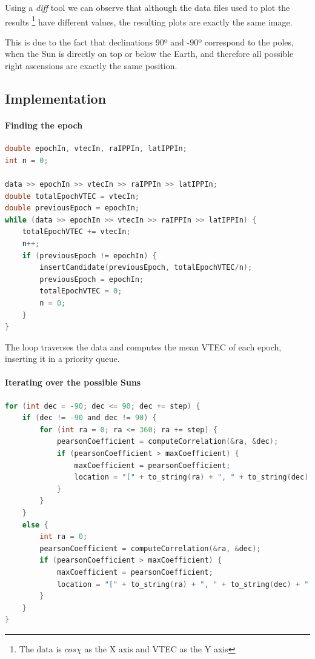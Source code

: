 Using a \textit{diff} tool we can observe that although the data files used to plot the results \footnote{The data is $cos\chi$ as the X axis and VTEC as the Y axis} have different values, the resulting plots are exactly the same image.

This is due to the fact that declinations 90º and -90º correspond to the poles, when the Sun is directly on top or below the Earth, and therefore all possible right ascensions are exactly the same position.

\subsection{Implementation}

\paragraph{Finding the epoch}

\begin{minipage}{\linewidth}
\begin{lstlisting}[language=c, caption=Finding a VTEC spike]
double epochIn, vtecIn, raIPPIn, latIPPIn;
int n = 0;

data >> epochIn >> vtecIn >> raIPPIn >> latIPPIn;
double totalEpochVTEC = vtecIn;
double previousEpoch = epochIn;
while (data >> epochIn >> vtecIn >> raIPPIn >> latIPPIn) {
	totalEpochVTEC += vtecIn;
	n++;
	if (previousEpoch != epochIn) {
		insertCandidate(previousEpoch, totalEpochVTEC/n);
		previousEpoch = epochIn;
		totalEpochVTEC = 0;
		n = 0;
	}
}
\end{lstlisting}
\end{minipage}

The loop traverses the data and computes the mean VTEC of each epoch, inserting it in a priority queue.

\paragraph{Iterating over the possible Suns}
\begin{minipage}{\linewidth}
\begin{lstlisting}[language=c, caption=Main loops]
for (int dec = -90; dec <= 90; dec += step) {
	if (dec != -90 and dec != 90) {
		for (int ra = 0; ra <= 360; ra += step) {
			pearsonCoefficient = computeCorrelation(&ra, &dec);
			if (pearsonCoefficient > maxCoefficient) {
				maxCoefficient = pearsonCoefficient;
				location = "[" + to_string(ra) + ", " + to_string(dec) + "]";
			}
		}
	}
	else {
		int ra = 0;
		pearsonCoefficient = computeCorrelation(&ra, &dec);
		if (pearsonCoefficient > maxCoefficient) {
			maxCoefficient = pearsonCoefficient;
			location = "[" + to_string(ra) + ", " + to_string(dec) + "]";
		}
	}
}
\end{lstlisting}
\end{minipage}

